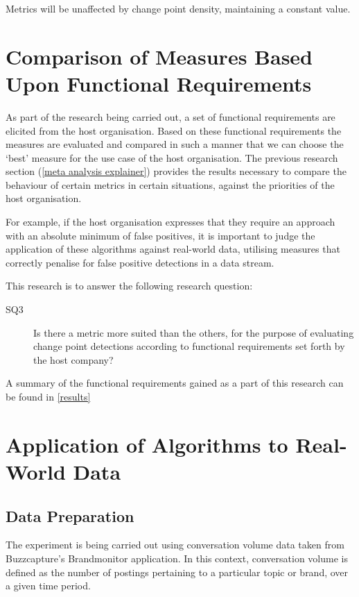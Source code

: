 \documentclass[../main.tex]{subfiles}
\begin{document}
\begin{nullhypothesis}
    Metrics will be unaffected by change point density, maintaining a constant value.
\end{nullhypothesis}

\section{Comparison of Measures Based Upon Functional Requirements}

As part of the research being carried out, a set of functional requirements are elicited from the host organisation. Based on these functional requirements the measures are evaluated and compared in such a manner that we can choose the `best' measure for the use case of the host organisation. The previous research section (\autoref{meta analysis explainer}) provides the results necessary to compare the behaviour of certain metrics in certain situations, against the priorities of the host organisation.

For example, if the host organisation expresses that they require an approach with an absolute minimum of false positives, it is important to judge the application of these algorithms against real-world data, utilising measures that correctly penalise for false positive detections in a data stream.

This research is to answer the following research question:

\begin{description}
    \item[SQ3] Is there a metric more suited than the others, for the purpose of evaluating change point detections according to functional requirements set forth by the host company?
\end{description}


A summary of the functional requirements gained as a part of this research can be found in \autoref{results}


\section{Application of Algorithms to Real-World Data}
\label{real world explainer}

\subsection{Data Preparation}

The experiment is being carried out using conversation volume data taken from Buzzcapture's Brandmonitor application. In this context, conversation volume is defined as the number of postings pertaining to a particular topic or brand, over a given time period.
\end{document}
